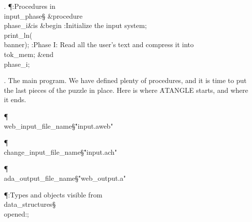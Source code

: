 . \P\?:Procedures in \\{input\_phase}\X\mathrel{+}\S\?\6
\&{procedure}\8\1\\{phase\_i}\2\8\&{is}\8\1\6
\4\&{begin}\6
:Initialize the input system\X;\6
\\{print\_ln}\?\1(\?\\{banner}\?\2)\?;\6
:Phase I: Read all the user's text and compress it into \\{tok\_mem}\X;\2\6
\&{end}\8\\{phase\_i};\par
\fi

.  The main program.
We have defined plenty of procedures, and it is time to put the last
pieces of the puzzle in place. Here is where \.{ATANGLE} starts, and where
it ends.

\Y\P\4\D\\{web\_input\_file\_name}\?\S\?\.{"input.aweb"}\?\6
\?\par
\P\4\D\\{change\_input\_file\_name}\?\S\?\.{"input.ach"}\?\6
\?\par
\P\4\D\\{ada\_output\_file\_name}\?\S\?\.{"web\_output.a"}\?\6
\?\par
\Y\P\?\4:Types and objects visible from \\{data\_structures}\X\mathrel{+}\S%
\?\6
\\{opened}\?:\?\?\K\?;\par
\fi

